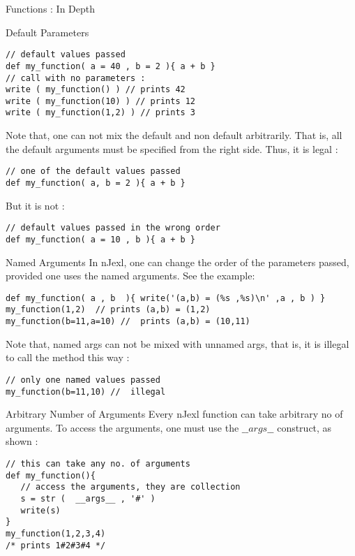 \begin{section}{Functions : In Depth}
\begin{subsection}{Default Parameters}
\begin{lstlisting}[style=JexlStyle]
// default values passed 
def my_function( a = 40 , b = 2 ){ a + b }
// call with no parameters :
write ( my_function() ) // prints 42 
write ( my_function(10) ) // prints 12 
write ( my_function(1,2) ) // prints 3 
\end{lstlisting}
Note that, one can not mix the default and non default arbitrarily.
That is, all the default arguments must be specified from the right side.
Thus, it is legal :
\begin{lstlisting}[style=JexlStyle]
// one of the default values passed 
def my_function( a, b = 2 ){ a + b }
\end{lstlisting}
But it is not :
\begin{lstlisting}[style=JexlStyle]
// default values passed in the wrong order
def my_function( a = 10 , b ){ a + b }
\end{lstlisting}
\end{subsection}

\begin{subsection}{Named Arguments}
In nJexl, one can change the order of the parameters passed, 
provided one uses the named arguments.
See the example:

\begin{lstlisting}[style=JexlStyle]
def my_function( a , b  ){ write('(a,b) = (%s ,%s)\n' ,a , b ) }
my_function(1,2)  // prints (a,b) = (1,2) 
my_function(b=11,a=10) //  prints (a,b) = (10,11) 
\end{lstlisting}
Note that, named args can not be mixed with unnamed args,
that is, it is illegal to call the method this way :

\begin{lstlisting}[style=JexlStyle]
// only one named values passed 
my_function(b=11,10) //  illegal 
\end{lstlisting}

\end{subsection}


\begin{subsection}{Arbitrary Number of Arguments}
Every nJexl function can take arbitrary no of arguments.
To access the arguments, one must use the $\_\_args\_\_$ construct, as shown :
\begin{lstlisting}[style=JexlStyle]
// this can take any no. of arguments 
def my_function(){ 
   // access the arguments, they are collection  
   s = str (  __args__ , '#' )
   write(s)  
}
my_function(1,2,3,4)
/* prints 1#2#3#4 */
\end{lstlisting}


\end{subsection}
\end{section}
